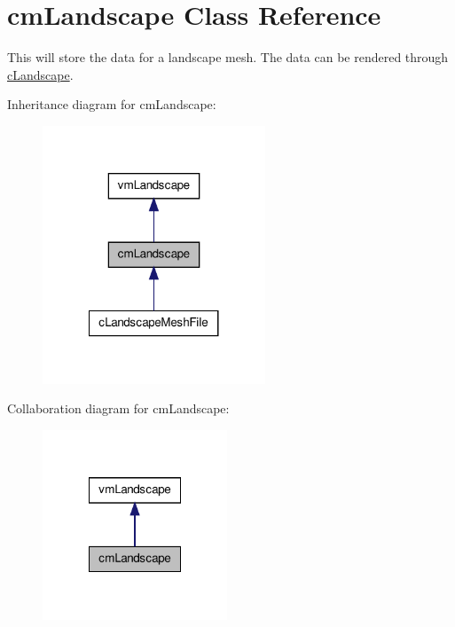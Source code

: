 \hypertarget{classcm_landscape}{
\section{cmLandscape Class Reference}
\label{classcm_landscape}
}


This will store the data for a landscape mesh. The data can be rendered through \hyperlink{classc_landscape}{cLandscape}.  




Inheritance diagram for cmLandscape:
\nopagebreak
\begin{figure}[H]
\begin{center}
\leavevmode
\includegraphics[width=188pt]{classcm_landscape__inherit__graph}
\end{center}
\end{figure}


Collaboration diagram for cmLandscape:
\nopagebreak
\begin{figure}[H]
\begin{center}
\leavevmode
\includegraphics[width=156pt]{classcm_landscape__coll__graph}
\end{center}
\end{figure}
